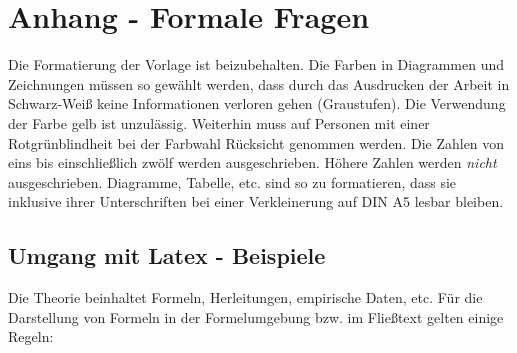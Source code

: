 \chapter{Anhang - Formale Fragen}
Die Formatierung der Vorlage ist beizubehalten. Die Farben in Diagrammen und Zeichnungen müssen so gewählt werden, dass durch das Ausdrucken der Arbeit in Schwarz-Weiß keine Informationen verloren gehen (Graustufen). Die Verwendung der Farbe gelb ist unzulässig. Weiterhin muss auf Personen mit einer Rotgrünblindheit bei der Farbwahl Rücksicht genommen werden. Die Zahlen von eins bis einschließlich zwölf werden ausgeschrieben. Höhere Zahlen werden \emph{nicht} ausgeschrieben. Diagramme, Tabelle, etc. sind so zu formatieren, dass sie inklusive ihrer Unterschriften bei einer Verkleinerung auf DIN A5 lesbar bleiben.
%
\section{Umgang mit Latex - Beispiele}
%
Die Theorie beinhaltet Formeln, Herleitungen, empirische Daten, etc. Für die Darstellung von Formeln in der Formelumgebung bzw. im Fließtext gelten einige Regeln:


